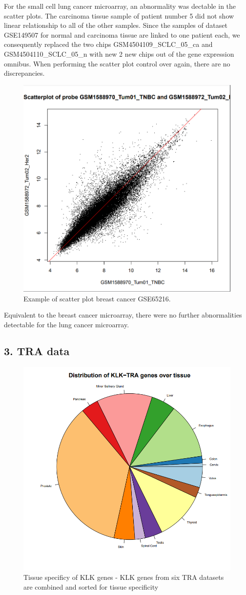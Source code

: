 \documentclass[
]{article}
\begin{document}
For the small cell lung cancer microarray, an abnormality was dectable
in the scatter plots. The carcinoma tissue sample of patient number 5
did not show linear relationship to all of the other samples. Since the
samples of dataset GSE149507 for normal and carcinoma tissue are linked
to one patient each, we consequently replaced the two chips
GSM4504109\_SCLC\_05\_ca and GSM4504110\_SCLC\_05\_n with new 2 new
chips out of the gene expression omnibus. When performing the scatter
plot control over again, there are no discrepancies.\\

\begin{figure}

{\centering \includegraphics[width=0.5\linewidth]{images/breast_scatter_example1} 

}

\caption{Example of scatter plot breast cancer GSE65216.}\label{fig:Broken chip - lung qc}
\end{figure}

Equivalent to the breast cancer microarray, there were no further
abnormalities detectable for the lung cancer microarray.

\hypertarget{tra-data}{%
\subsection{3. TRA data}\label{tra-data}}

\begin{figure}

{\centering \includegraphics[width=0.5\linewidth]{images/piechart_TRA} 

}

\caption{Tissue specificy of KLK genes - KLK genes from six TRA datasets are combined and sorted for tissue specificity}\label{fig:TRA -piechart}
\end{figure}
\end{document}
